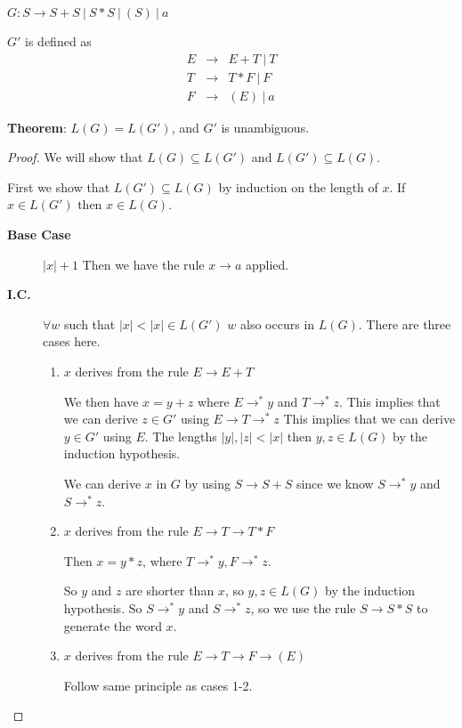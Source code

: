 \documentclass[12pt]{article}
\begin{document}
$G: S \to S+S\ |\ S*S\ |\ (S)\ |\ a$

$G'$ is defined as
\begin{eqnarray*}
	E &\to& E + T \ |\  T\\
	T &\to& T * F \ |\  F\\
	F &\to& (E)\ |\ a
\end{eqnarray*}

\textbf{Theorem}: $L(G)=L(G')$, and $G'$ is unambiguous.
\begin{proof}
	We will show that $L(G) \subseteq L(G')$ and $L(G') \subseteq L(G)$.

	First we show that $L(G') \subseteq L(G)$ by induction on the length of $x$.
	If $x \in L(G')$ then $x \in L(G)$.

	\begin{description}
		\item[\textbf{Base Case}]
			
			$|x|+1$ Then we have the rule $x \to a$ applied.
		\item[\textbf{I.C.}] 

			$\forall w$ such that $|x|<|x| \in L(G')$ $w$ also occurs in $L(G)$.
			There are three cases here.
			\begin{enumerate}
				\item $x$ derives from the rule $E \to E + T$

					We then have $x = y + z$ where $E \to^* y$ and $T \to^* z$.
					This implies that we can derive $z \in G'$ using $E \to
					T\to^* z$
					This implies that we can derive $y \in G'$ using $E$. The
					lengths $|y|,|z|<|x|$ then $y,z \in L(G)$ by the induction
					hypothesis.

					We can derive $x$ in $G$ by using $S \to S + S$ since we
					know $S \to^*y$ and $S \to^*z$.

				\item $x$ derives from the rule $E \to T \to T * F$

					Then $x = y*z$, where $T \to^*y, F \to^*z$.

					So $y$ and $z$ are shorter than $x$, so $y,z \in L(G)$ by
					the induction hypothesis. So $S \to^*y$ and $S \to^*z$, so
					we use the rule $S \to S*S$ to generate the word $x$.

				\item $x$ derives from the rule $E \to T \to F \to (E)$

					Follow same principle as cases 1-2.
			\end{enumerate}
	\end{description}


\end{proof}
\end{document}
